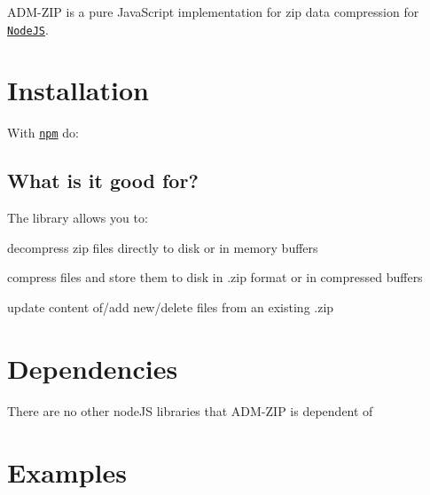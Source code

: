 A\+D\+M-\/\+Z\+I\+P is a pure Java\+Script implementation for zip data compression for \href{http://nodejs.org/}{\tt Node\+J\+S}.

\section*{Installation}

With \href{http://npmjs.org}{\tt npm} do\+: 


\subsection*{What is it good for?}

The library allows you to\+:


\begin{DoxyItemize}
\item decompress zip files directly to disk or in memory buffers
\item compress files and store them to disk in .zip format or in compressed buffers
\item update content of/add new/delete files from an existing .zip
\end{DoxyItemize}

\section*{Dependencies}

There are no other node\+J\+S libraries that A\+D\+M-\/\+Z\+I\+P is dependent of

\section*{Examples}

